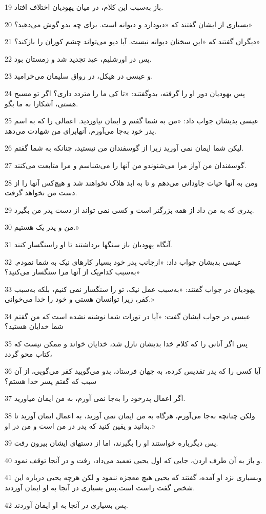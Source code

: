 \par 19 باز به‌سبب این کلام، در میان یهودیان اختلاف افتاد.
\par 20 بسیاری از ایشان گفتند که «دیودارد و دیوانه است. برای چه بدو گوش می‌دهید؟»
\par 21 دیگران گفتند که «این سخنان دیوانه نیست. آیا دیو می‌تواند چشم کوران را بازکند؟»
\par 22 پس در اورشلیم، عید تجدید شد و زمستان بود.
\par 23 و عیسی در هیکل، در رواق سلیمان می‌خرامید.
\par 24 پس یهودیان دور او را گرفته، بدوگفتند: «تا کی ما را متردد داری؟ اگر تو مسیح هستی، آشکارا به ما بگو.
\par 25 عیسی بدیشان جواب داد: «من به شما گفتم و ایمان نیاوردید. اعمالی را که به اسم پدر خود به‌جا می‌آورم، آنهابرای من شهادت می‌دهد.
\par 26 لیکن شما ایمان نمی آورید زیرا از گوسفندان من نیستید، چنانکه به شما گفتم.
\par 27 گوسفندان من آواز مرا می‌شنوندو من آنها را می‌شناسم و مرا متابعت می‌کنند.
\par 28 ومن به آنها حیات جاودانی می‌دهم و تا به ابد هلاک نخواهند شد و هیچ‌کس آنها را از دست من نخواهد گرفت.
\par 29 پدری که به من داد از همه بزرگتر است و کسی نمی تواند از دست پدر من بگیرد.
\par 30 من و پدر یک هستیم.»
\par 31 آنگاه یهودیان باز سنگها برداشتند تا او راسنگسار کنند.
\par 32 عیسی بدیشان جواب داد: «ازجانب پدر خود بسیار کارهای نیک به شما نمودم. به‌سبب کدام‌یک از آنها مرا سنگسار می‌کنید؟»
\par 33 یهودیان در جواب گفتند: «به‌سبب عمل نیک، تو را سنگسار نمی کنیم، بلکه به‌سبب کفر، زیرا توانسان هستی و خود را خدا می‌خوانی.»
\par 34 عیسی در جواب ایشان گفت: «آیا در تورات شما نوشته نشده است که من گفتم شما خدایان هستید؟
\par 35 پس اگر آنانی را که کلام خدا بدیشان نازل شد، خدایان خواند و ممکن نیست که کتاب محو گردد،
\par 36 آیا کسی را که پدر تقدیس کرده، به جهان فرستاد، بدو می‌گویید کفر می‌گویی، از آن سبب که گفتم پسر خدا هستم؟
\par 37 اگر اعمال پدرخود را به‌جا نمی آورم، به من ایمان میاورید.
\par 38 ولکن چنانچه به‌جا می‌آورم، هرگاه به من ایمان نمی آورید، به اعمال ایمان آورید تا بدانید و یقین کنید که پدر در من است و من در او.»
\par 39 پس دیگرباره خواستند او را بگیرند، اما از دستهای ایشان بیرون رفت.
\par 40 و باز به آن طرف اردن، جایی که اول یحیی تعمید می‌داد، رفت و در آنجا توقف نمود.
\par 41 وبسیاری نزد او آمده، گفتند که یحیی هیچ معجزه ننمود و لکن هر‌چه یحیی درباره این شخص گفت راست است.پس بسیاری در آنجا به او ایمان آوردند.
\par 42 پس بسیاری در آنجا به او ایمان آوردند.

